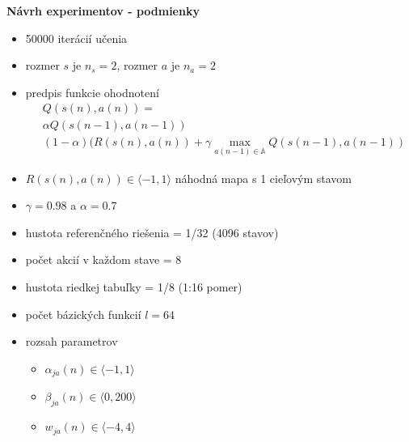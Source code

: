 \documentclass[xcolor=dvipsnames]{beamer}
\begin{document}
\begin{frame}{\bf Návrh experimentov - podmienky}

\begin{itemize}
\item 50000 iterácií učenia
\item rozmer $s$ je $n_s = 2$, rozmer $a$ je $n_a = 2$
\item predpis funkcie ohodnotení
\begin{align}
&Q(s(n),a(n)) = \nonumber \\
&\alpha Q(s(n-1),a(n-1)) \nonumber \\
&(1- \alpha)(R(s(n),a(n)) + \gamma \max_{a(n-1) \in \mathbb{A}} Q(s(n-1), a(n-1)) \nonumber
\end{align}

\item $R(s(n), a(n)) \in \langle -1, 1 \rangle$ náhodná mapa s 1 cieľovým stavom
\item $\gamma = 0.98$ a $\alpha = 0.7$
\item hustota referenčného riešenia = 1/32  (4096 stavov)
\item počet akcií v každom stave = 8
\item hustota riedkej tabuľky = 1/8  (1:16 pomer)
\item počet bázických funkcií $l = 64$
\item rozsah parametrov
    \begin{itemize}
      \item $\alpha_{ja}(n) \in \langle -1, 1 \rangle$
      \item $\beta_{ja}(n) \in \langle 0, 200 \rangle$
      \item $w_{ja}(n) \in \langle -4, 4 \rangle$
    \end{itemize}
\end{itemize}

\end{frame}
\end{document}
